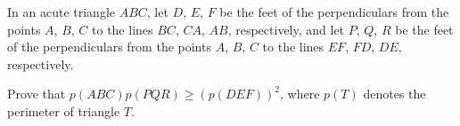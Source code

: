 \item[\textbf{G7.}]
In an acute triangle 
$ABC$, 
 let 
$D$, 
$E$, 
$F$
 be the feet of the perpendiculars from the points 
$A$, 
$B$, 
$C$
 to the lines 
$BC$,
$CA$, 
$AB$, 
 respectively, and let 
$P$, 
$Q$, 
$R$
 be the feet of the perpendiculars from the points 
$A$, 
$B$, 
$C$
 to the lines 
$EF$, 
$FD$, 
$DE$, 
 respectively.


Prove that 
$p\left(ABC\right)p\left(PQR\right) \ge \left(p\left(DEF\right)\right)^{2}$, 
 where 
$p\left(T\right)$
 denotes the perimeter of triangle 
$T$.